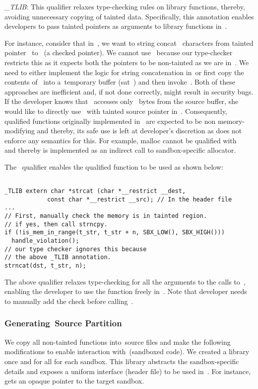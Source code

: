 \noindent\emph{\_TLIB}:
This qualifier relaxes type-checking rules on library functions, thereby, avoiding unnecessary copying of tainted data.
Specifically, this annotation enables developers to pass tainted pointers as arguments to library functions in~\cregion.

For instance, consider that in~\cregion, we want to string concat~ characters from tainted pointer~ to~ (a checked pointer).
We cannot use~ because our type-checker restricts this as it expects both the pointers to be non-tainted as we are in~\cregion.
We need to either implement the logic for string concatenation in~\cregion or first copy the contents of~ into a~\cregion temporary buffer (sat~) and then invoke~.
Both of these approaches are inefficient and, if not done correctly, might result in security bugs.
If the developer knows that~ accesses only~ bytes from the source buffer, she would like to directly use~ with tainted source pointer in~\cregion.
Consequently, ~ qualified functions originally implemented in ~\cregion are expected to be non memory-modifying and thereby, its safe use is left at developer's discretion as \systemname does not enforce any semantics for this.  For example, malloc cannot be qualified with ~ and thereby is implemented as an indirect call to sandbox-specific allocator.    

The~ qualifier enables the qualified function to be used as shown below:
\begin{verbatim}

_TLIB extern char *strcat (char *__restrict __dest,
            const char *__restrict __src); // In the header file
...
// First, manually check the memory is in tainted region.
// if yes, then call strncpy.
if (!is_mem_in_range(t_str, t_str + n, SBX_LOW(), SBX_HIGH()))
  handle_violation();
// our type checker ignores this because 
// the above _TLIB annotation.
strncat(dst, t_str, n);
\end{verbatim}
The above qualifier relaxes type-checking for all the arguments to the calls to~, enabling the developer to use the function freely in~\cregion.
Note that developer needs to manually add the check before calling~.

\subsubsection{Generating~\cregion Source Partition}
\label{subsub:gencregion}
We copy all non-tainted functions into~\cregion source files and make the following modifications to enable interaction with~\ucregion (\ie sandboxed code).
We created a library once and for all for each sandbox.
This library abstracts the sandbox-specific details and exposes a uniform interface (header file) to be used in~\cregion.
For instance,~ gets an opaque pointer to the target sandbox.

